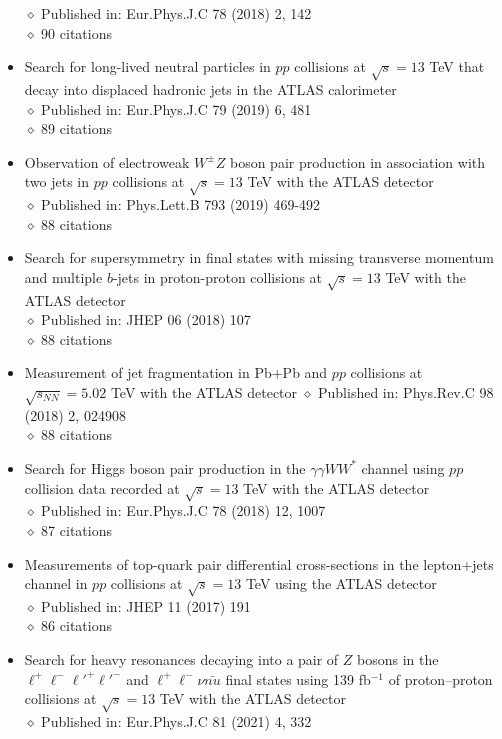 \documentclass[margin, 10pt]{res} %
\begin{document}
\begin{resume}
\begin{itemize}
$\diamond$ Published in: Eur.Phys.J.C 78 (2018) 2, 142\\
$\diamond$ 90 citations
\item Search for long-lived neutral particles in $pp$ collisions at $\sqrt{s} = 13$ TeV that decay into displaced hadronic jets in the ATLAS calorimeter\\
$\diamond$ Published in: Eur.Phys.J.C 79 (2019) 6, 481\\
$\diamond$ 89 citations
\item Observation of electroweak $W^{\pm}Z$ boson pair production in association with two jets in $pp$ collisions at $\sqrt{s} = 13$ TeV with the ATLAS detector\\
$\diamond$ Published in: Phys.Lett.B 793 (2019) 469-492\\
$\diamond$ 88 citations
\item Search for supersymmetry in final states with missing transverse momentum and multiple $b$-jets in proton-proton collisions at $\sqrt{s} = 13$ TeV with the ATLAS detector\\
$\diamond$ Published in: JHEP 06 (2018) 107\\
$\diamond$ 88 citations
\item Measurement of jet fragmentation in Pb+Pb and $pp$ collisions at $\sqrt{s_{NN}} = 5.02$ TeV with the ATLAS detector
$\diamond$ Published in: Phys.Rev.C 98 (2018) 2, 024908\\
$\diamond$ 88 citations
\item Search for Higgs boson pair production in the $\gamma\gamma WW^{*}$ channel using $pp$collision data recorded at $\sqrt{s} = 13$ TeV with the ATLAS detector\\
$\diamond$ Published in: Eur.Phys.J.C 78 (2018) 12, 1007\\
$\diamond$ 87 citations
\item Measurements of top-quark pair differential cross-sections in the lepton+jets channel in $pp$ collisions at $\sqrt{s} = 13$ TeV using the ATLAS detector\\
$\diamond$ Published in: JHEP 11 (2017) 191\\
$\diamond$ 86 citations
\item Search for heavy resonances decaying into a pair of $Z$ bosons in the $\ell^{+}\ell^{-}\ell'^{+}\ell'^{-}$ and $\ell^{+}\ell^{-}\nu\bar{nu}$  final states using 139 fb$^{-1}$ of proton–proton collisions at $\sqrt{s} = 13$ TeV with the ATLAS detector\\
$\diamond$ Published in: Eur.Phys.J.C 81 (2021) 4, 332\\

\end{itemize}
\end{resume}
\end{document}

